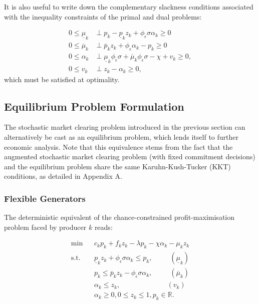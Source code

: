 \documentclass{article}
\begin{document}
It is also useful to write down the complementary slackness conditions associated with the inequality constraints of the primal and dual problems:

\begin{align}
0 \le \underline{\mu}_k &\perp p_k - \underline{p}_k z_k + \phi_{\epsilon} \sigma \alpha_k \ge 0\\
0 \le \overline{\mu}_k &\perp \overline{p}_k z_k + \phi_{\epsilon} \alpha_k - p_k \ge 0\\
0 \le \alpha_k &\perp \underline{\mu}_k \phi_{\epsilon} \sigma + \overline{\mu}_k \phi_{\epsilon} \sigma - \chi + v_k \ge 0,\\
0 \le v_k & \perp z_k - \alpha_k \ge 0,
\end{align}
which must be satisfied at optimality.

\subsection{Equilibrium Problem Formulation}

The stochastic market clearing problem introduced in the previous section can alternatively be cast as an equilibrium problem, which lends itself to further economic analysis. Note that this equivalence stems from the fact that the augmented stochastic market clearing problem (with fixed commitment decisions) and the equilibrium problem share the same Karuhn-Kush-Tucker (KKT) conditions, as detailed in Appendix A.

\subsubsection{Flexible Generators}
The deterministic equivalent of the chance-constrained profit-maximisation problem faced by producer $k$ reads:

\begin{align}
\min \hspace{10pt} & c_k p_k + f_k z_k - \lambda p_k - \chi \alpha_k - \mu_k z_k\\
\mbox{s.t. } & \underline{p}_k z_k + \phi_{\epsilon} \sigma \alpha_k \le p_k, \hspace{30pt} (\underline{\mu}_k)\\
& p_k \le \overline{p}_k z_k - \phi_{\epsilon} \sigma \alpha_k, \hspace{30pt} (\overline{\mu}_k)\\
& \alpha_k \le z_k, \hspace{80pt} (v_k)\\
& \alpha_k \ge 0, 0 \le z_k \le 1, p_k \in \mathbb{R}.
\end{align}
\end{document}
